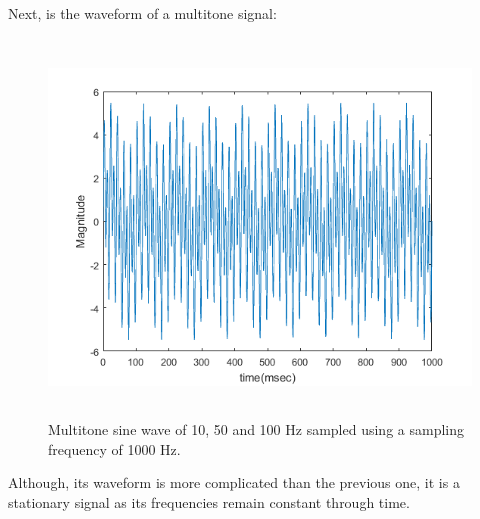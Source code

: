 Next, is the waveform of a multitone signal:
\begin{figure}[H]
\includegraphics[width=12cm,height=10cm,center,keepaspectratio]{figures/multitone}
\caption{Multitone sine wave of 10, 50 and 100 Hz sampled using a sampling frequency of 1000 Hz.}
\label{Fig:multitone}
\end{figure}
Although, its waveform is more complicated than the previous one, it is a stationary signal as its frequencies remain constant through time.
